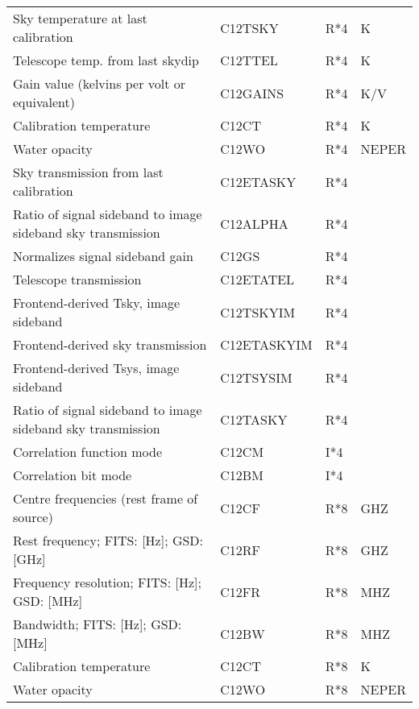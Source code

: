 \begin{tabular}{||l|l|l|l||}
Sky temperature at last calibration            & C12TSKY    & R*4    & K    \\      
Telescope temp. from last skydip               & C12TTEL    & R*4    & K    \\      
Gain value (kelvins per volt or equivalent)    & C12GAINS   & R*4    & K/V  \\      
Calibration temperature                        & C12CT      & R*4    & K    \\      
Water opacity                                  & C12WO      & R*4    & NEPER\\      
Sky transmission from last calibration         & C12ETASKY  & R*4    & ~    \\      
Ratio of signal sideband to image sideband sky transmission & C12ALPHA   & R*4    & ~    \\      
Normalizes signal sideband gain                & C12GS      & R*4    & ~   \\      
Telescope transmission                         & C12ETATEL  & R*4    & ~   \\      
Frontend-derived Tsky, image sideband          & C12TSKYIM  & R*4    & ~   \\      
Frontend-derived sky transmission              & C12ETASKYIM& R*4    & ~   \\      
Frontend-derived Tsys, image sideband          & C12TSYSIM  & R*4    & ~   \\      
Ratio of signal sideband to image sideband sky transmission & C12TASKY   & R*4    & ~   \\      
Correlation function mode                      & C12CM    & I*4    &   ~   \\      
Correlation bit mode                           & C12BM    & I*4    &   ~   \\ 
Centre frequencies (rest frame of source)      & C12CF    & R*8    & GHZ   \\      
Rest frequency; FITS: [Hz]; GSD: [GHz]         & C12RF    & R*8    & GHZ   \\      
Frequency resolution; FITS: [Hz]; GSD: [MHz]   & C12FR    & R*8    & MHZ   \\      
Bandwidth; FITS: [Hz]; GSD: [MHz]              & C12BW    & R*8    & MHZ   \\      
Calibration temperature                        & C12CT    & R*8    & K     \\      
Water opacity                                  & C12WO    & R*8    & NEPER \\ \hline
\end{tabular}
 \\

